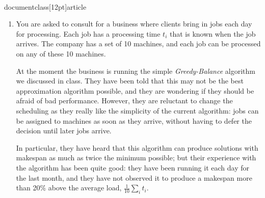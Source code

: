 \\documentclass[12pt]{article}
\begin{document}
\begin{enumerate}
{\bf (b)} Show that the number of trucks used by this
algorithm is within a factor of $2$ of the minimum possible number,
for any set of weights and any value of $K$.





\item 

You are asked to consult for a business where clients
bring in jobs each day for processing.
Each job has a processing time $t_i$ that is known when the
job arrives. The company has a set of 10 machines,
and each job can be processed on any of these 10 machines.

At the moment the business is running
the simple {\em Greedy-Balance} algorithm we discussed
in class. They have been told that this may not be the best
approximation algorithm possible, and they are wondering
if they should be afraid of bad performance.
However, they are reluctant to change the scheduling as they
really like the simplicity of the current algorithm:
jobs can be assigned to machines as soon as they arrive,
without having to defer the decision until later jobs arrive.

In particular, they have heard that this algorithm
can produce solutions with makespan as much as twice the minimum
possible; but their experience with the algorithm has been quite good:
they have been running it each day for the last
month, and they have not observed it to produce a
makespan more than 20\% above the average load,
$\frac{1}{10}\sum_i t_i$.


\end{enumerate}
\end{document}
